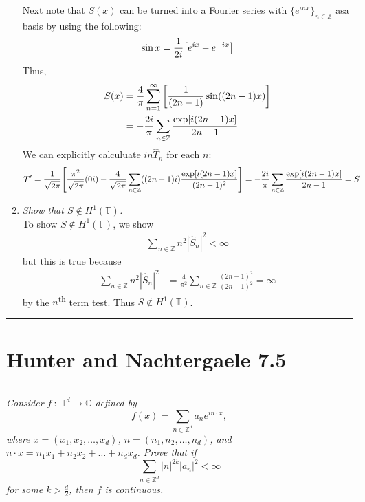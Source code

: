\documentclass[fontsize=11pt]{article} %
\theoremstyle{plain}
\numberwithin{equation}{section} %
\numberwithin{figure}{section} %
\numberwithin{table}{section} %
\begin{document}
\begin{enumerate}[\bf (a)]
        Next note that $S(x)$ can be turned into a Fourier series with $\{e^{inx}\}_{n\in\mathbb{Z}}$ asa basis by using the following:
        \begin{align*}
            \sin x = \frac{1}{2i}\qty[e^{ix} - e^{-ix}]
        \end{align*}
        Thus,
        \begin{align*}
            S(x) &= \frac{4}{\pi}\sum_{n=1}^\infty\qty[\frac{1}{(2n-1)}\sin((2n-1)x)] \\
            &= -\frac{2i}{\pi}\sum_{n\in\mathbb{Z}}\frac{\exp[i(2n-1)x]}{2n-1}
        \end{align*}
        We can explicitly calculuate $in\hat{T}_n$ for each $n$:
        \begin{align*}
            T' = \frac{1}{\sqrt{2\pi}}\qty[\frac{\pi^2}{\sqrt{2\pi}}(0i) - \frac{4}{\sqrt{2\pi}}\sum_{n\in\mathbb{Z}}((2n-1)i)\frac{\exp[i(2n-1)x]}{(2n-1)^2}] &= -\frac{2i}{\pi}\sum_{n\in\mathbb{Z}}\frac{\exp[i(2n-1)x]}{2n-1} = S
        \end{align*}
    \item
        \emph{Show that $S \not\in H^1(\mathbb{T})$.} \\

        To show $S \not\in H^1(\mathbb{T})$, we show
        \begin{align*}
            \sum_{n\in\mathbb{Z}} n^2 |\hat{S}_n|^2 < \infty
        \end{align*}
        but this is true because
        \begin{align*}
            \sum_{n\in\mathbb{Z}} n^2 |\hat{S}_n|^2 &= \frac{4}{\pi^2}\sum_{n\in\mathbb{Z}} \frac{(2n-1)^2}{(2n-1)^2} = \infty
        \end{align*}
        by the $n$\textsuperscript{th} term test.  Thus $S \not\in H^1(\mathbb{T})$.
\end{enumerate}

\begin{center}
    \noindent\rule{5cm}{1pt}
\end{center}
\section{\bf Hunter and Nachtergaele 7.5}
\begin{center}
    \noindent\rule{5cm}{1pt}
\end{center}

\emph{Consider $f\ :\ \mathbb{T}^d \rightarrow \mathbb{C}$ defined by $$f(x) = \sum_{n\in\mathbb{Z}^d}a_n e^{i n \cdot x},$$ where $x = (x_1, x_2, \dots, x_d)$, $n = (n_1, n_2, \dots, n_d)$, and $n\cdot x = n_1x_1 + n_2x_2 + \dots + n_dx_d$.  Prove that if $$\sum_{n\in\mathbb{Z}^d}|n|^{2k}|a_n|^2 <\infty$$ for some $k > \frac{d}{2}$, then $f$ is continuous.} \\
\end{document}

